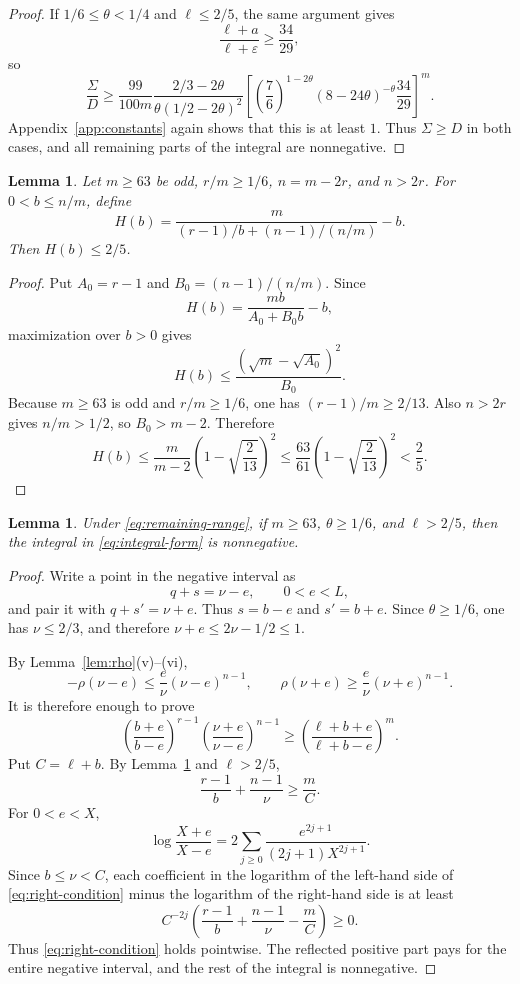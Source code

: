 \documentclass[11pt]{article}
\numberwithin{equation}{section}
\newtheorem{lemma}[theorem]{Lemma}
\newcommand{\eps}{\varepsilon}
\begin{document}
\begin{proof}
If $1/6\le\theta<1/4$ and $\ell\le2/5$, the same argument gives
\[
        \frac{\ell+a}{\ell+\eps}\ge\frac{34}{29},
\]
so
\begin{equation}\label{eq:tail-B}
 \frac{\Sigma}{D}
 \ge\frac{99}{100m}
 \frac{2/3-2\theta}{\theta(1/2-2\theta)^2}
 \left[
 \left(\frac76\right)^{1-2\theta}
 (8-24\theta)^{-\theta}
 \frac{34}{29}
 \right]^m.
\end{equation}
Appendix~\ref{app:constants} again shows that this is at least $1$. Thus $\Sigma\ge D$ in both cases, and all remaining parts of the integral are nonnegative.
\end{proof}

\begin{lemma}\label{lem:threshold}
Let $m\ge63$ be odd, $r/m\ge1/6$, $n=m-2r$, and $n>2r$. For $0<b\le n/m$, define
\[
        H(b)=\frac{m}{(r-1)/b+(n-1)/(n/m)}-b.
\]
Then $H(b)\le2/5$.
\end{lemma}

\begin{proof}
Put $A_0=r-1$ and $B_0=(n-1)/(n/m)$. Since
\[
        H(b)=\frac{mb}{A_0+B_0b}-b,
\]
maximization over $b>0$ gives
\[
        H(b)\le\frac{(\sqrt m-\sqrt{A_0})^2}{B_0}.
\]
Because $m\ge63$ is odd and $r/m\ge1/6$, one has $(r-1)/m\ge2/13$. Also $n>2r$ gives $n/m>1/2$, so $B_0>m-2$. Therefore
\[
 H(b)
 \le\frac{m}{m-2}\left(1-\sqrt{\frac2{13}}\right)^2
 \le\frac{63}{61}\left(1-\sqrt{\frac2{13}}\right)^2
 <\frac25.
\]
\end{proof}

\begin{lemma}\label{lem:right-reflection}
Under \eqref{eq:remaining-range}, if $m\ge63$, $\theta\ge1/6$, and $\ell>2/5$, then the integral in \eqref{eq:integral-form} is nonnegative.
\end{lemma}

\begin{proof}
Write a point in the negative interval as
\[
        q+s=\nu-e,
        \qquad 0<e<L,
\]
and pair it with $q+s'=\nu+e$. Thus $s=b-e$ and $s'=b+e$. Since $\theta\ge1/6$, one has $\nu\le2/3$, and therefore $\nu+e\le2\nu-1/2\le1$.

By Lemma~\ref{lem:rho}(v)--(vi),
\[
        -\rho(\nu-e)\le\frac e\nu(\nu-e)^{n-1},
        \qquad
        \rho(\nu+e)\ge\frac e\nu(\nu+e)^{n-1}.
\]
It is therefore enough to prove
\begin{equation}\label{eq:right-condition}
 \left(\frac{b+e}{b-e}\right)^{r-1}
 \left(\frac{\nu+e}{\nu-e}\right)^{n-1}
 \ge
 \left(\frac{\ell+b+e}{\ell+b-e}\right)^m.
\end{equation}
Put $C=\ell+b$. By Lemma~\ref{lem:threshold} and $\ell>2/5$,
\[
        \frac{r-1}{b}+\frac{n-1}{\nu}\ge\frac mC.
\]
For $0<e<X$,
\[
        \log\frac{X+e}{X-e}
        =2\sum_{j\ge0}\frac{e^{2j+1}}{(2j+1)X^{2j+1}}.
\]
Since $b\le\nu<C$, each coefficient in the logarithm of the left-hand side of \eqref{eq:right-condition} minus the logarithm of the right-hand side is at least
\[
 C^{-2j}\left(
 \frac{r-1}{b}+\frac{n-1}{\nu}-\frac mC
 \right)\ge0.
\]
Thus \eqref{eq:right-condition} holds pointwise. The reflected positive part pays for the entire negative interval, and the rest of the integral is nonnegative.
\end{proof}
\end{document}
